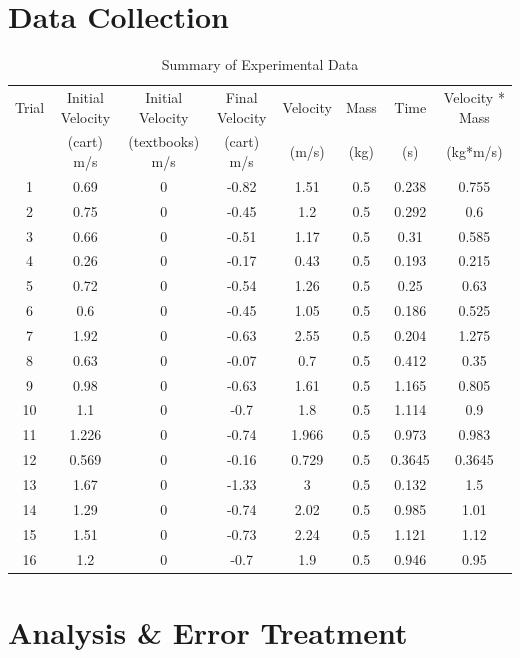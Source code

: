 \documentclass[12pt]{article}
\begin{document}
\section{Data Collection}
\begin{table}[H]
    \centering
    \caption{Summary of Experimental Data}
    \label{tab:data}
    \begin{tabular}{cccccccc}
        \toprule
        Trial & Initial Velocity & Initial Velocity & Final Velocity & Velocity & Mass & Time & Velocity * Mass \\
              & (cart) m/s & (textbooks) m/s & (cart) m/s & (m/s) & (kg) & (s) & (kg*m/s) \\
        \midrule
        1  & 0.69  & 0 & -0.82 & 1.51 & 0.5 & 0.238 & 0.755 \\
        2  & 0.75  & 0 & -0.45 & 1.2  & 0.5 & 0.292 & 0.6   \\
        3  & 0.66  & 0 & -0.51 & 1.17 & 0.5 & 0.31  & 0.585 \\
        4  & 0.26  & 0 & -0.17 & 0.43 & 0.5 & 0.193 & 0.215 \\
        5  & 0.72  & 0 & -0.54 & 1.26 & 0.5 & 0.25  & 0.63  \\
        6  & 0.6   & 0 & -0.45 & 1.05 & 0.5 & 0.186 & 0.525 \\
        7  & 1.92  & 0 & -0.63 & 2.55 & 0.5 & 0.204 & 1.275 \\
        8  & 0.63  & 0 & -0.07 & 0.7  & 0.5 & 0.412 & 0.35  \\
        9  & 0.98  & 0 & -0.63 & 1.61 & 0.5 & 1.165 & 0.805 \\
        10 & 1.1   & 0 & -0.7  & 1.8  & 0.5 & 1.114 & 0.9   \\
        11 & 1.226 & 0 & -0.74 & 1.966 & 0.5 & 0.973 & 0.983 \\
        12 & 0.569 & 0 & -0.16 & 0.729 & 0.5 & 0.3645 & 0.3645 \\
        13 & 1.67  & 0 & -1.33 & 3    & 0.5 & 0.132 & 1.5   \\
        14 & 1.29  & 0 & -0.74 & 2.02 & 0.5 & 0.985 & 1.01  \\
        15 & 1.51  & 0 & -0.73 & 2.24 & 0.5 & 1.121 & 1.12  \\
        16 & 1.2   & 0 & -0.7  & 1.9  & 0.5 & 0.946 & 0.95  \\
        \bottomrule
    \end{tabular}
\end{table}

\section{Analysis \& Error Treatment}
\end{document}
